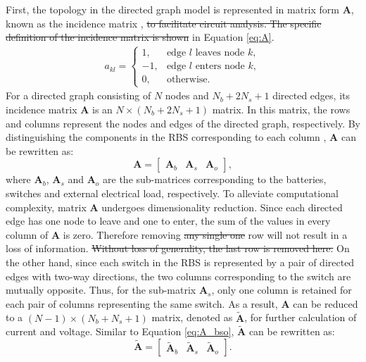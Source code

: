 \documentclass{article}
\providecommand{\DIFadd}[1]{{\protect\color{blue}\uwave{#1}}} %
\providecommand{\DIFdel}[1]{{\protect\color{red}\sout{#1}}}                      %
\providecommand{\DIFaddbegin}{} %
\providecommand{\DIFaddend}{} %
\providecommand{\DIFdelbegin}{} %
\providecommand{\DIFdelend}{} %
\newcommand{\DIFscaledelfig}{0.5}
\newlength{\DIFdelgraphicswidth} %
\newlength{\DIFdelgraphicsheight} %
\newcommand{\DIFaddincludegraphics}[2][]{{\color{blue}\fbox{\DIFOincludegraphics[#1]{#2}}}} %
\newcommand{\DIFdelincludegraphics}[2][]{%
\sbox{\DIFdelgraphicsbox}{\DIFOincludegraphics[#1]{#2}}%
\settoboxwidth{\DIFdelgraphicswidth}{\DIFdelgraphicsbox} %
\settoboxtotalheight{\DIFdelgraphicsheight}{\DIFdelgraphicsbox} %
\scalebox{\DIFscaledelfig}{%
\parbox[b]{\DIFdelgraphicswidth}{\usebox{\DIFdelgraphicsbox}\\[-\baselineskip] \rule{\DIFdelgraphicswidth}{0em}}\llap{\resizebox{\DIFdelgraphicswidth}{\DIFdelgraphicsheight}{%
\setlength{\unitlength}{\DIFdelgraphicswidth}%
\begin{picture}(1,1)%
\thicklines\linethickness{2pt} %
{\color[rgb]{1,0,0}\put(0,0){\framebox(1,1){}}}%
{\color[rgb]{1,0,0}\put(0,0){\line( 1,1){1}}}%
{\color[rgb]{1,0,0}\put(0,1){\line(1,-1){1}}}%
\end{picture}%
}\hspace*{3pt}}} %
} %
\DeclareRobustCommand{\DIFaddbegin}{\DIFOaddbegin \let\includegraphics\DIFaddincludegraphics} %
\DeclareRobustCommand{\DIFaddend}{\DIFOaddend \let\includegraphics\DIFOincludegraphics} %
\DeclareRobustCommand{\DIFdelbegin}{\DIFOdelbegin \let\includegraphics\DIFdelincludegraphics} %
\DeclareRobustCommand{\DIFdelend}{\DIFOaddend \let\includegraphics\DIFOincludegraphics} %
\begin{document}
First, the topology in the directed graph model is represented in matrix form $\bm{A}$, known as the incidence matrix , \DIFdelbegin \DIFdel{to facilitate circuit analysis.
The specific definition of the incidence matrix is shown }\DIFdelend \DIFaddbegin \DIFadd{defined }\DIFaddend in Equation \ref{eq:A}.
\begin{align}\label{eq:A}
    a_{kl}=
    \begin{cases}
        1,  & \text{edge $l$ leaves node $k$},\\
        -1, & \text{edge $l$ enters node $k$},\\
        0,  & \text{otherwise}.
    \end{cases}
\end{align}
For a directed graph consisting of $N$ nodes and $N_b+2N_s+1$ directed edges, its incidence matrix $\bm{A}$ is an $N\times(N_b+2N_s+1)$ matrix. 
In this matrix, the rows and columns represent the nodes and edges of the directed graph, respectively.
By distinguishing the components in the RBS corresponding to each column , $\bm{A}$ can be rewritten as:
\begin{equation}\label{eq:A_bso}
    \bm{A} =
    \begin{bmatrix}
        \bm{A}_b & \bm{A}_s & \bm{A}_o
    \end{bmatrix},
\end{equation}
where $\bm{A}_b$, $\bm{A}_s$ and $\bm{A}_o$ are the sub-matrices corresponding to the batteries, switches and external electrical load, respectively.
To alleviate computational complexity, matrix $\bm{A}$ undergoes dimensionality reduction.
Since each directed edge has one node to leave and one to enter, the sum of the values in every column of $\bm{A}$ is zero.
Therefore removing \DIFdelbegin \DIFdel{any single one }\DIFdelend \DIFaddbegin \DIFadd{the last }\DIFaddend row will not result in a loss of information. 
\DIFdelbegin \DIFdel{Without loss of generality, the last row is removed here.
}\DIFdelend On the other hand, since each switch in the RBS is represented by a pair of directed edges with two-way directions, the two columns corresponding to the switch are mutually opposite.
Thus, for the sub-matrix $\bm{A}_s$, only one column is retained for each pair of columns representing the same switch.
As a result, $\bm{A}$ can be reduced to a $(N-1)\times(N_b+N_s+1)$ matrix, denoted as $\bm{\tilde{A}}$, for further calculation of current and voltage.
Similar to Equation \ref{eq:A_bso}, $\bm{\tilde{A}}$ can be rewritten as:
\begin{equation}\label{eq:A_bso_tilde}
    \bm{\tilde{A}} =
    \begin{bmatrix}
        \bm{\tilde{A}}_b & \bm{\tilde{A}}_s & \bm{\tilde{A}}_o
    \end{bmatrix}.
\end{equation}
\end{document}
